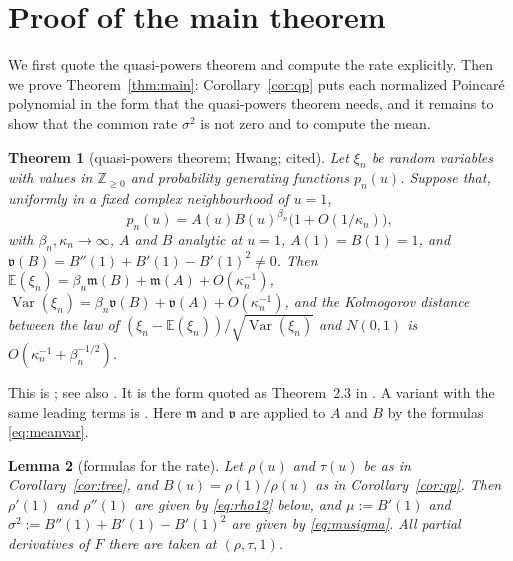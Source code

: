 \documentclass[11pt]{amsart}
\newtheorem{theorem}{Theorem}[section]
\newtheorem{lemma}[theorem]{Lemma}
\theoremstyle{definition}
\theoremstyle{remark}
\numberwithin{equation}{section}
\DeclareMathOperator{\Var}{Var}
\newcommand{\ZZ}{\mathbb{Z}}
\newcommand{\E}{\mathbb{E}}
\newcommand{\mean}{\mathfrak{m}}
\newcommand{\var}{\mathfrak{v}}
\begin{document}
\section{Proof of the main theorem}\label{sec:proof}

We first quote the quasi-powers theorem and compute the rate explicitly. Then we prove Theorem~\ref{thm:main}: Corollary~\ref{cor:qp} puts each normalized Poincar\'e polynomial in the form that the quasi-powers theorem needs, and it remains to show that the common rate \(\sigma^2\) is not zero and to compute the mean.

\begin{theorem}[quasi-powers theorem; Hwang; cited]\label{thm:hwang}
Let \(\xi_n\) be random variables with values in \(\ZZ_{\ge0}\) and probability generating functions \(p_n(u)\). Suppose that, uniformly in a fixed complex neighbourhood of \(u=1\),
\[
p_n(u)=A(u)B(u)^{\beta_n}\bigl(1+O(1/\kappa_n)\bigr),
\]
with \(\beta_n,\kappa_n\to\infty\), \(A\) and \(B\) analytic at \(u=1\), \(A(1)=B(1)=1\), and \(\var(B)=B''(1)+B'(1)-B'(1)^2\ne0\). Then \(\E(\xi_n)=\beta_n\mean(B)+\mean(A)+O(\kappa_n^{-1})\), \(\Var(\xi_n)=\beta_n\var(B)+\var(A)+O(\kappa_n^{-1})\), and the Kolmogorov distance between the law of \((\xi_n-\E(\xi_n))/\sqrt{\Var(\xi_n)}\) and \(N(0,1)\) is \(O(\kappa_n^{-1}+\beta_n^{-1/2})\).
\end{theorem}

This is \cite{Hw}; see also \cite[Thm.~IX.8]{FS}. It is the form quoted as Theorem~2.3 in \cite{CK}. A variant with the same leading terms is \cite[Thm.~2.22]{Dr}. Here \(\mean\) and \(\var\) are applied to \(A\) and \(B\) by the formulas \eqref{eq:meanvar}.

\begin{lemma}[formulas for the rate]\label{lem:formulas}
Let \(\rho(u)\) and \(\tau(u)\) be as in Corollary~\ref{cor:tree}, and \(B(u)=\rho(1)/\rho(u)\) as in Corollary~\ref{cor:qp}. Then \(\rho'(1)\) and \(\rho''(1)\) are given by \eqref{eq:rho12} below, and \(\mu:=B'(1)\) and \(\sigma^2:=B''(1)+B'(1)-B'(1)^2\) are given by \eqref{eq:musigma}. All partial derivatives of \(F\) there are taken at \((\rho,\tau,1)\).
\end{lemma}
\end{document}
